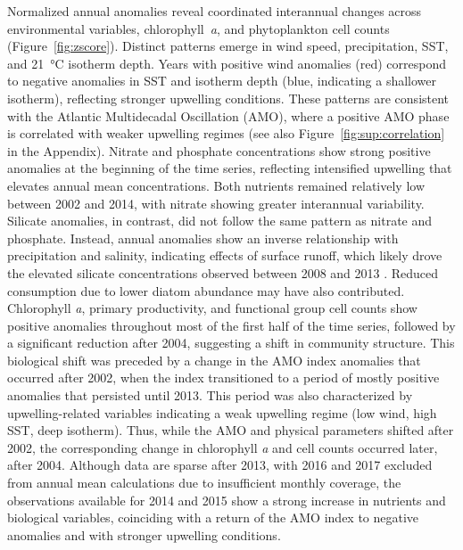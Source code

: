 \documentclass[]{agujournal2019}
\begin{document}
    Normalized annual anomalies reveal coordinated interannual changes across environmental variables, chlorophyll~\textit{a}, and phytoplankton cell counts (Figure~\ref{fig:zscore}). Distinct patterns emerge in wind speed, precipitation, SST, and \qty{21}{\celsius} isotherm depth.  Years with positive wind anomalies (red) correspond to negative anomalies in SST and isotherm depth (blue, indicating a shallower isotherm), reflecting stronger upwelling conditions. These patterns are consistent with the Atlantic Multidecadal Oscillation (AMO), where a positive AMO phase is correlated with weaker upwelling regimes (see also Figure~\ref{fig:sup:correlation} in the Appendix).  Nitrate and phosphate concentrations show strong positive anomalies at the beginning of the time series, reflecting intensified upwelling that elevates annual mean concentrations. Both nutrients remained relatively low between 2002 and 2014, with nitrate showing greater interannual variability.  Silicate anomalies, in contrast, did not follow the same pattern as nitrate and phosphate. Instead, annual anomalies show an inverse relationship with precipitation and salinity, indicating effects of surface runoff, which likely drove the elevated silicate concentrations observed between 2008 and 2013 \cite{lorenzoni_characterization_2015}. Reduced consumption due to lower diatom abundance may have also contributed.
    Chlorophyll \textit{a}, primary productivity, and functional group cell counts show positive anomalies throughout most of the first half of the time series, followed by a significant reduction after 2004, suggesting a shift in community structure.
     This biological shift was preceded by a change in the AMO index anomalies that occurred after 2002, when the index transitioned to a period of mostly positive anomalies that persisted until 2013. This period was also characterized by upwelling-related variables indicating a weak upwelling regime (low wind, high SST, deep isotherm). Thus, while the AMO and physical parameters shifted after 2002, the corresponding change in chlorophyll \textit{a} and cell counts occurred later, after 2004. 
     Although data are sparse after 2013, with 2016 and 2017 excluded from annual mean calculations due to insufficient monthly coverage, the observations available for 2014 and 2015 show a strong increase in nutrients and biological variables, coinciding with a return of the AMO index to negative anomalies and with stronger upwelling conditions. 
\end{document}
